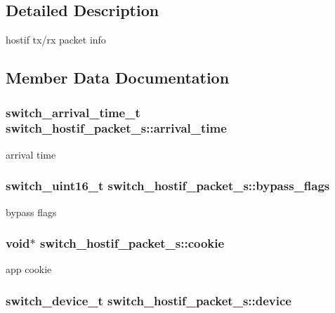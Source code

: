 \subsection{Detailed Description}
hostif tx/rx packet info 

\subsection{Member Data Documentation}
\hypertarget{structswitch__hostif__packet__s_a25e59dce20c857179d7ddff4eda4cf01}{
\subsubsection[{arrival\+\_\+time}]{\setlength{\rightskip}{0pt plus 5cm}switch\+\_\+arrival\+\_\+time\+\_\+t switch\+\_\+hostif\+\_\+packet\+\_\+s\+::arrival\+\_\+time}}\label{structswitch__hostif__packet__s_a25e59dce20c857179d7ddff4eda4cf01}
arrival time \hypertarget{structswitch__hostif__packet__s_a8b6ada7d0d168182daae16fe40849b8b}{
\subsubsection[{bypass\+\_\+flags}]{\setlength{\rightskip}{0pt plus 5cm}switch\+\_\+uint16\+\_\+t switch\+\_\+hostif\+\_\+packet\+\_\+s\+::bypass\+\_\+flags}}\label{structswitch__hostif__packet__s_a8b6ada7d0d168182daae16fe40849b8b}
bypass flags \hypertarget{structswitch__hostif__packet__s_a539be41c85958076ed897bc458b1b202}{
\subsubsection[{cookie}]{\setlength{\rightskip}{0pt plus 5cm}void$\ast$ switch\+\_\+hostif\+\_\+packet\+\_\+s\+::cookie}}\label{structswitch__hostif__packet__s_a539be41c85958076ed897bc458b1b202}
app cookie \hypertarget{structswitch__hostif__packet__s_a9b7931344bd7cf4209e9f24e81c13d31}{
\subsubsection[{device}]{\setlength{\rightskip}{0pt plus 5cm}switch\+\_\+device\+\_\+t switch\+\_\+hostif\+\_\+packet\+\_\+s\+::device}}\label{structswitch__hostif__packet__s_a9b7931344bd7cf4209e9f24e81c13d31}

